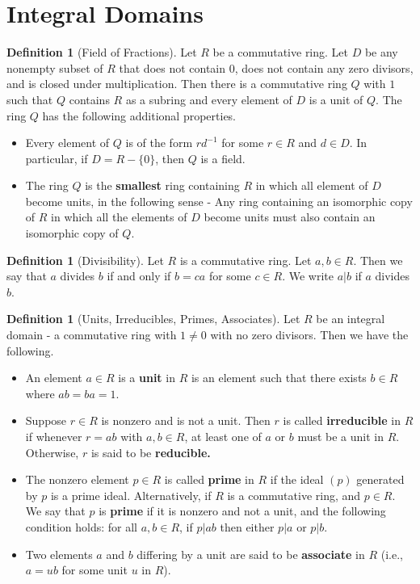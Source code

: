 \documentclass[10pt, oneside, reqno]{amsart}
\theoremstyle{plain}%
\theoremstyle{definition}
\newtheorem{defn}[thm]{Definition}
\theoremstyle{remark}
\begin{document}
\section{Integral Domains} %
\label{cha:integral_domains}


\begin{defn}[Field of Fractions]
	Let $R$ be a commutative ring.  Let $D$ be any nonempty subset of $R$ that does not contain 0, does not contain any zero divisors, and is closed under multiplication.  Then there is a commutative ring $Q$ with $1$ such that $Q$ contains $R$ as a subring and every element of $D$ is a unit of $Q$.  The ring $Q$ has the following additional properties.
	\begin{itemize}
		\item Every element of $Q$ is of the form $r d^{-1}$ for some $r \in R$ and $d \in D$.   In particular, if $D = R - \{0\}$, then $Q$ is a field.
		\item The ring $Q$ is the \textbf{smallest} ring containing $R$ in which all element of $D$ become units,
 in the following sense - Any ring containing an isomorphic copy of $R$ in which all the elements of $D$ become units must also contain an isomorphic copy of $Q$.	
	\end{itemize}
\end{defn}

\begin{defn}[Divisibility]
	Let $R$ is a commutative ring.  Let $a,b \in R$.  Then we say that $a$ divides $b$ if and only if $b = ca$ for some $c \in R$.  We write $a | b$ if $a$ divides $b$. 
\end{defn}

\begin{defn}[Units, Irreducibles, Primes, Associates]
	Let $R$ be an integral domain - a commutative ring with $1 \neq 0$ with no zero divisors.  Then we have the following.
	\begin{itemize}
		\item An element $a \in R$ is a  \textbf{unit} in $R$ is an element such that there exists $b \in R$ where $ab = ba = 1$.
		\item Suppose $r \in R$ is nonzero and is not a unit.  Then $r$ is called \textbf{irreducible } in $R$ if whenever $r = ab$ with $a,b \in R$, at least one of $a$ or $b$ must be a unit in $R$.  Otherwise, $r$ is said to be \textbf{reducible.}
		\item The nonzero element $p \in R$ is called \textbf{prime} in $R$ if the ideal $(p)$ generated by $p$ is a prime ideal.  Alternatively, if $R$ is a commutative ring, and $p \in R$.  We say that $p$ is \textbf{prime} if it is nonzero and not a unit, and the following condition holds: for all $a,b \in R$, if $p | ab$ then either $p | a$ or $p | b$.
		\item Two elements $a$ and $b$ differing by a unit are said to be \textbf{associate} in $R$ (i.e., $a = ub$ for some unit $u$ in $R$).
	\end{itemize}
\end{defn}
\end{document}
